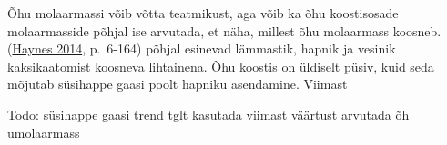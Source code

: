 \documentclass[
  12pt,
  a4paper,
  onecolumn, twoside]{article}
\newenvironment{Shaded}{\begin{snugshade}}{\end{snugshade}}
\newcommand{\AttributeTok}[1]{\textcolor[rgb]{0.77,0.63,0.00}{#1}}
\newcommand{\CommentTok}[1]{\textcolor[rgb]{0.56,0.35,0.01}{\textit{#1}}}
\newcommand{\DecValTok}[1]{\textcolor[rgb]{0.00,0.00,0.81}{#1}}
\newcommand{\FunctionTok}[1]{\textcolor[rgb]{0.00,0.00,0.00}{#1}}
\newcommand{\NormalTok}[1]{#1}
\newcommand{\SpecialCharTok}[1]{\textcolor[rgb]{0.00,0.00,0.00}{#1}}
\newcommand{\StringTok}[1]{\textcolor[rgb]{0.31,0.60,0.02}{#1}}
\begin{document}
\begin{Shaded}
\end{Shaded}

Õhu molaarmassi võib võtta teatmikust, aga võib ka õhu koostisosade molaarmasside põhjal ise arvutada, et näha, millest õhu molaarmass koosneb. (\protect\hyperlink{ref-haynes_2014_crc}{Haynes 2014}, p.~6-164) põhjal esinevad lämmastik, hapnik ja vesinik kaksikaatomist koosneva lihtainena. Õhu koostis on üldiselt püsiv, kuid seda mõjutab süsihappe gaasi poolt hapniku asendamine. Viimast

Todo:
süsihappe gaasi trend
tglt kasutada viimast väärtust
arvutada õh umolaarmass
\end{document}
